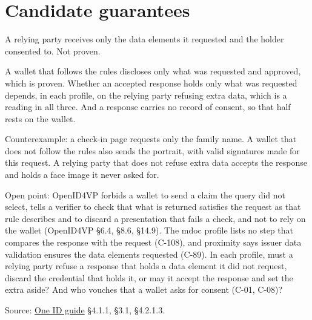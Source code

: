 
\section{Candidate guarantees}

\begin{theorem}
  \label{thm:g01}
  A relying party receives only the data elements it requested and the holder
  consented to.  Not proven.

  A wallet that follows the rules discloses only what was requested and
  approved, which is proven.  Whether an accepted response holds only what was
  requested depends, in each profile, on the relying party refusing extra
  data, which is a reading in all three.  And a response carries no record of
  consent, so that half rests on the wallet.

  Counterexample: a check-in page requests only the family name.  A wallet
  that does not follow the rules also sends the portrait, with valid
  signatures made for this request.  A relying party that does not refuse
  extra data accepts the response and holds a face image it never asked for.

  Open point: OpenID4VP forbids a wallet to send a claim the query did not
  select, tells a verifier to check that what is returned satisfies the
  request as that rule describes and to discard a presentation that fails a
  check, and not to rely on the wallet (OpenID4VP §6.4, §8.6, §14.9).  The
  mdoc profile lists no step that compares the response with the request
  (C-108), and proximity says issuer data validation ensures the data
  elements requested (C-89).  In each profile, must a relying party refuse a
  response that holds a data element it did not request, discard the
  credential that holds it, or may it accept the response and set the extra
  aside?  And who vouches that a wallet asks for consent (C-01, C-08)?

  Source:
  \href{https://standards.atlassian.net/wiki/spaces/OneID/pages/2947416082/Technical+Implementation+Guide}{One ID guide} §4.1.1, §3.1, §4.2.1.3.
\end{theorem}

